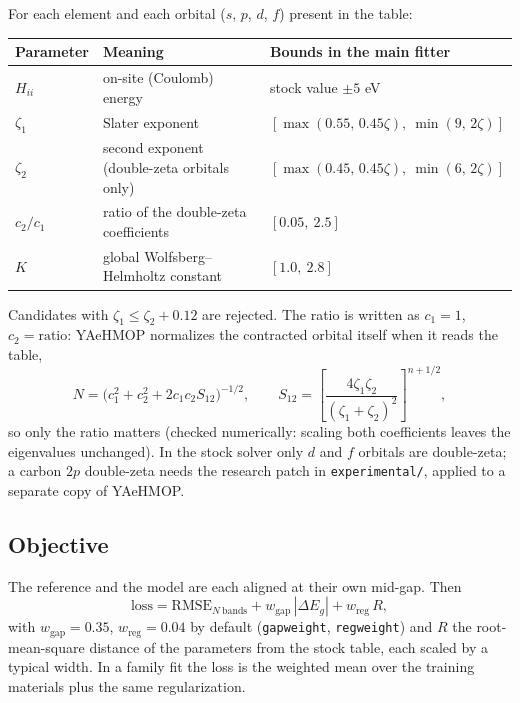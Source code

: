 \documentclass[11pt,a4paper]{article}
\newcommand{\cmd}[1]{\texttt{#1}}
\renewcommand{\_}{\origunderscore\allowbreak}
\begin{document}
For each element and each orbital ($s$, $p$, $d$, $f$) present in the table:

\begin{center}
\begin{tabularx}{\textwidth}{l L L}
\toprule
Parameter & Meaning & Bounds in the main fitter \\
\midrule
$H_{ii}$ & on-site (Coulomb) energy & stock value $\pm 5$ eV \\
$\zeta_1$ & Slater exponent & $[\max(0.55,\,0.45\zeta),\ \min(9,\,2\zeta)]$ \\
$\zeta_2$ & second exponent (double-zeta orbitals only) & $[\max(0.45,\,0.45\zeta),\ \min(6,\,2\zeta)]$ \\
$c_2/c_1$ & ratio of the double-zeta coefficients & $[0.05,\ 2.5]$ \\
$K$ & global Wolfsberg--Helmholtz constant & $[1.0,\ 2.8]$ \\
\bottomrule
\end{tabularx}
\end{center}

Candidates with $\zeta_1 \le \zeta_2 + 0.12$ are rejected. The ratio is written as $c_1 = 1$,
$c_2 = \text{ratio}$: YAeHMOP normalizes the contracted orbital itself when it reads the table,
\begin{equation*}
  N = \bigl(c_1^2 + c_2^2 + 2c_1c_2S_{12}\bigr)^{-1/2},\qquad
  S_{12} = \left[\frac{4\zeta_1\zeta_2}{(\zeta_1+\zeta_2)^2}\right]^{n+1/2},
\end{equation*}
so only the ratio matters (checked numerically: scaling both coefficients leaves the eigenvalues
unchanged). In the stock solver only $d$ and $f$ orbitals are double-zeta; a carbon $2p$ double-zeta
needs the research patch in \cmd{experimental/}, applied to a separate copy of YAeHMOP.

\subsection{Objective}

The reference and the model are each aligned at their own mid-gap. Then
\begin{equation*}
  \text{loss} = \mathrm{RMSE}_{N\ \text{bands}} + w_\text{gap}\,|\Delta E_g| + w_\text{reg}\,R ,
\end{equation*}
with $w_\text{gap} = 0.35$, $w_\text{reg} = 0.04$ by default (\cmd{gap\_weight}, \cmd{reg\_weight}) and
$R$ the root-mean-square distance of the parameters from the stock table, each scaled by a typical
width. In a family fit the loss is the weighted mean over the training materials plus the same
regularization.
\end{document}
